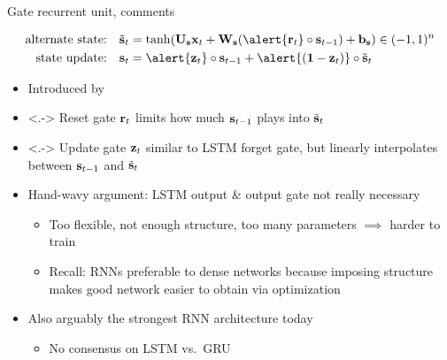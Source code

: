 \begin{frame}{Gate recurrent unit, comments}
    \begin{block}{}
        \vspace{-5mm}
        \begin{align*}
            \text{alternate state:} \quad \st_t &= \tanh(\U_\s \x_t + \W_\s (\alert{\r_t} \circ \s_{t-1}) + \b_\s) \in (-1, 1)^n \\
            \text{state update:} \quad \s_t &= \alert{\z_t} \circ \s_{t-1} + \alert{(\one - \z_t)} \circ \st_t
        \end{align*}
    \end{block}

    \begin{itemize}
        \item<+-> Introduced by \citet{ChoEMNLP14}
        \item<.-> \alert{Reset gate $\mathbf{r}_t$} limits how much $\mathbf{s}_{t-1}$ plays into $\tilde{\mathbf{s}}_t$
        \item<.-> \alert{Update gate $\mathbf{z}_t$} similar to LSTM{} forget gate, but linearly interpolates between $\mathbf{s}_{t-1}$ and $\tilde{\mathbf{s}}_t$
        \item<+-> Hand-wavy argument: LSTM{} output \& output gate not really necessary
        \begin{itemize}
            \item Too flexible, not enough structure, too many parameters $\implies$ harder to train
            \item Recall: RNN{}s preferable to dense networks because imposing structure makes good network easier to obtain via optimization
        \end{itemize}
        \item<+-> Also arguably the strongest RNN{} architecture today \citep{JozefowiczICML15}
        \begin{itemize}
            \item No consensus on LSTM{} vs.~GRU{}
        \end{itemize}
    \end{itemize}
\end{frame}

